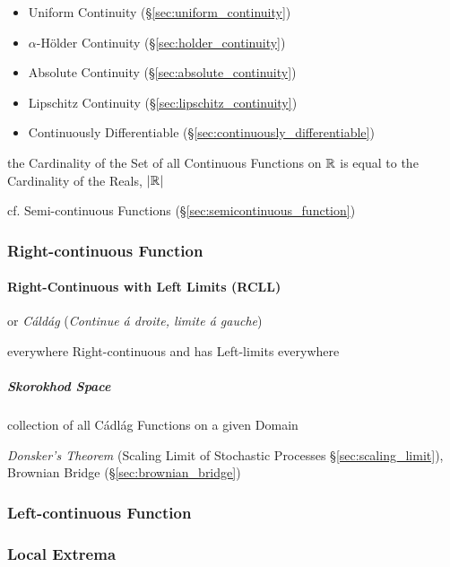 \begin{itemize}
  \item Uniform Continuity (\S\ref{sec:uniform_continuity})
  \item $\alpha$-H\"older Continuity (\S\ref{sec:holder_continuity})
  \item Absolute Continuity (\S\ref{sec:absolute_continuity})
  \item Lipschitz Continuity (\S\ref{sec:lipschitz_continuity})
  \item Continuously Differentiable (\S\ref{sec:continuously_differentiable})
\end{itemize}

the Cardinality of the Set of all Continuous Functions on $\mathbb{R}$ is equal to
the Cardinality of the Reals, $|\mathbb{R}|$

\fist cf. Semi-continuous Functions (\S\ref{sec:semicontinuous_function})



\subsubsection{Right-continuous Function}\label{sec:right_continuous}

\paragraph{Right-Continuous with Left Limits (RCLL)}\label{sec:rcll}\hfill

or \emph{C\'ald\'ag} (\emph{Continue \'a droite, limite \'a gauche})

everywhere Right-continuous and has Left-limits everywhere



\subparagraph{Skorokhod Space}\label{sec:skorokhod_space}\hfill


collection of all C\'adl\'ag Functions on a given Domain

\fist \emph{Donsker's Theorem} (Scaling Limit of Stochastic Processes
\S\ref{sec:scaling_limit}), Brownian Bridge (\S\ref{sec:brownian_bridge})



\subsubsection{Left-continuous Function}\label{sec:left_continuous}

\subsubsection{Local Extrema}\label{sec:local_extrema}

